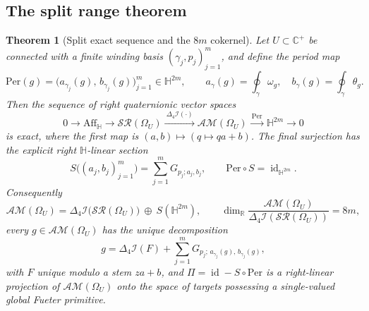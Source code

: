\documentclass[11pt,a4paper]{article}
\numberwithin{equation}{section}
\newtheorem{theorem}{Theorem}[section]
\theoremstyle{definition}
\theoremstyle{remark}
\theoremstyle{plain}
\newcommand{\HH}{\mathbb H}
\newcommand{\RR}{\mathbb R}
\newcommand{\CC}{\mathbb C}
\newcommand{\Cplus}{\CC^{+}}
\newcommand{\lap}{\Delta_4}
\newcommand{\I}{\mathcal I}
\newcommand{\SR}{\mathcal{SR}}
\newcommand{\AM}{\mathcal{AM}}
\newcommand{\Om}{\Omega}
\newcommand{\Aff}{\mathrm{Aff}_{\HH}}
\newcommand{\om}{\omega}
\newcommand{\thet}{\theta}
\newcommand{\Per}{\mathrm{Per}}
\begin{document}
\subsection{The split range theorem}

\begin{theorem}[Split exact sequence and the $8m$ cokernel]
\label{c:thm:split}
Let $U\subset\Cplus$ be connected with a finite winding basis
$(\gamma_j,p_j)_{j=1}^m$, and define the period map
\[
  \Per(g)=\bigl(a_{\gamma_j}(g),\,b_{\gamma_j}(g)\bigr)_{j=1}^{m}
   \in\HH^{2m},
  \qquad
  a_\gamma(g)=\oint_\gamma\om_g,\quad b_\gamma(g)=\oint_\gamma\thet_g .
\]
Then the sequence of right quaternionic vector spaces
\begin{equation}
  0\longrightarrow\Aff\longrightarrow\SR(\Om_U)
   \xrightarrow{\ \lap\I(\cdot)\ }\AM(\Om_U)
   \xrightarrow{\ \Per\ }\HH^{2m}\longrightarrow0
  \label{c:eq:exact}
\end{equation}
is exact, where the first map is $(a,b)\mapsto(q\mapsto qa+b)$.  The
final surjection has the explicit right $\HH$-linear section
\begin{equation}
  S\bigl((a_j,b_j)_{j=1}^m\bigr)=\sum_{j=1}^{m}G_{p_j;a_j,b_j},
  \qquad \Per\circ S=\operatorname{id}_{\HH^{2m}} .
  \label{c:eq:section}
\end{equation}
Consequently
\begin{equation}
  \AM(\Om_U)=\lap\I\bigl(\SR(\Om_U)\bigr)\ \oplus\ S(\HH^{2m}),
  \qquad
  \dim_{\RR}\frac{\AM(\Om_U)}{\lap\I(\SR(\Om_U))}=8m,
  \label{c:eq:directsum}
\end{equation}
every $g\in\AM(\Om_U)$ has the unique decomposition
\begin{equation}
  g=\lap\I(F)+\sum_{j=1}^{m}G_{p_j;\,a_{\gamma_j}(g),\,b_{\gamma_j}(g)},
  \label{c:eq:decomposition}
\end{equation}
with $F$ unique modulo a stem $za+b$, and
$\Pi=\operatorname{id}-S\circ\Per$ is a right-linear projection of
$\AM(\Om_U)$ onto the space of targets possessing a single-valued global
Fueter primitive.
\end{theorem}
\end{document}
